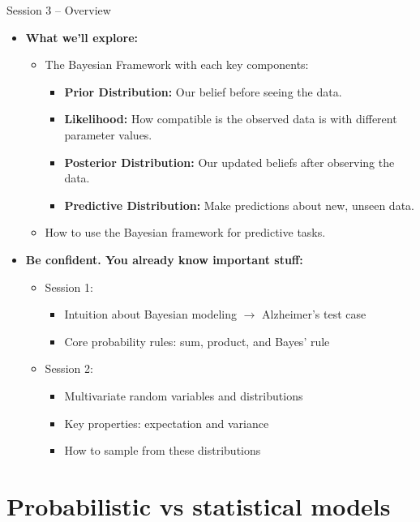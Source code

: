 \documentclass{beamer}
\begin{document}
\begin{frame}{Session 3 – Overview}
  \begin{itemize}
    \item \textbf{What we’ll explore:}
    \begin{itemize}
      \item The Bayesian Framework with each key components:
      \begin{itemize}
        \item \textbf{Prior Distribution:} Our belief before seeing the data.
        \item \textbf{Likelihood:} How compatible is the observed data is with different parameter values.
        \item \textbf{Posterior Distribution:} Our updated beliefs after observing the data.
        \item \textbf{Predictive Distribution:} Make predictions about new, unseen data.
      \end{itemize}
      \item How to use the Bayesian framework for predictive tasks.
    \end{itemize}
    \vspace{0.5cm}
    \item \textbf{Be confident. You already know important stuff:}
      \begin{itemize}
        \item Session 1:
          \begin{itemize}
            \item Intuition about Bayesian modeling $\rightarrow$ Alzheimer’s test case
            \item Core probability rules: sum, product, and Bayes' rule
            \end{itemize}
          \item Session 2:
            \begin{itemize}
              \item Multivariate random variables and distributions
              \item Key properties: expectation and variance
              \item How to sample from these distributions
            \end{itemize}
    \end{itemize}
  \end{itemize}
\end{frame}

\section{Probabilistic vs statistical models}
\end{document}
